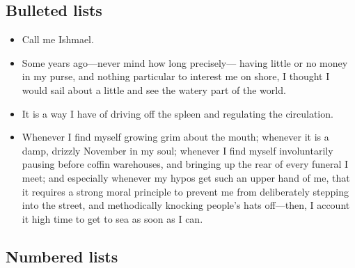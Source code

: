 \documentclass{article}
\begin{document}
\subsection{Bulleted lists}

\begin{itemize}
  \item Call me Ishmael.
  \item Some years ago---never mind how long precisely---
    having little or no money in my purse, and nothing particular to
    interest me on shore, I thought I would sail about a little and see
    the watery part of the world.
  \item It is a way I have of driving off the
    spleen and regulating the circulation.
  \item Whenever I find myself growing grim about the mouth; whenever it is a damp, drizzly
    November in my soul; whenever I find myself involuntarily pausing
    before coffin warehouses, and bringing up the rear of every funeral
    I meet; and especially whenever my hypos get such an upper hand of me,
    that it requires a strong moral principle to prevent me from
    deliberately stepping into the street, and methodically knocking
    people's hats off---then, I account it high time to get to sea as
    soon as I can.
\end{itemize}

\subsection{Numbered lists}
\end{document}
